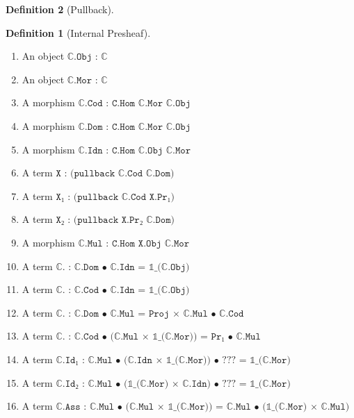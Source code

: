 \documentclass{book}
\theoremstyle{definition}
\newtheorem{definition}{Definition}
\begin{document}
\begin{definition}[Pullback]
\begin{definition}[Internal Presheaf] 
\begin{enumerate}
\item An object $\texttt{ℂ.Obj : ℂ}$
\item An object $\texttt{ℂ.Mor : ℂ}$ 
\item A morphism $\texttt{ℂ.Cod : C.Hom ℂ.Mor ℂ.Obj}$
\item A morphism $\texttt{ℂ.Dom : C.Hom ℂ.Mor ℂ.Obj}$
\item A morphism $\texttt{ℂ.Idn : C.Hom ℂ.Obj ℂ.Mor}$
\item A term $\texttt{X : (pullback ℂ.Cod ℂ.Dom)}$
\item A term $\texttt{X₁ : (pullback ℂ.Cod X.Pr₁)}$
\item A term $\texttt{X₂ : (pullback X.Pr₂ ℂ.Dom)}$
\item A morphism $\texttt{ℂ.Mul : C.Hom X.Obj ℂ.Mor}$
\item A term $\texttt{ℂ. : ℂ.Dom • ℂ.Idn = 𝟙\_(ℂ.Obj)}$
\item A term $\texttt{ℂ. : ℂ.Cod • ℂ.Idn = 𝟙\_(ℂ.Obj)}$
\item A term $\texttt{ℂ. : ℂ.Dom • ℂ.Mul =  Proj × ℂ.Mul • ℂ.Cod}$
\item A term $\texttt{ℂ. : ℂ.Cod • (ℂ.Mul × 𝟙\_(ℂ.Mor)) = Pr₁ • ℂ.Mul}$
\item A term $\texttt{ℂ.Id₁ : ℂ.Mul • (ℂ.Idn × 𝟙\_(ℂ.Mor)) • ??? = 𝟙\_(ℂ.Mor)}$
\item A term $\texttt{ℂ.Id₂ : ℂ.Mul • (𝟙\_(ℂ.Mor) × ℂ.Idn) • ??? = 𝟙\_(ℂ.Mor)}$
\item A term $\texttt{ℂ.Ass : ℂ.Mul • (ℂ.Mul × 𝟙\_(ℂ.Mor)) = ℂ.Mul • (𝟙\_(ℂ.Mor) × ℂ.Mul)}$
\end{enumerate}
\end{definition}


\end{definition}
\end{document}
